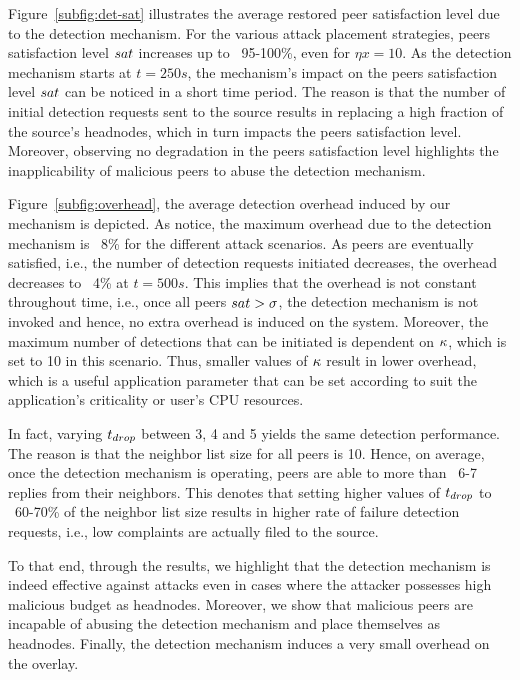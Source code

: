 Figure~\ref{subfig:det-sat} illustrates the average restored peer satisfaction level due to the detection mechanism.
For the various attack placement strategies, peers satisfaction level $sat$ increases up to ~95-100\%, even for $\eta x=10$.
As the detection mechanism starts at $t=250s$, the mechanism's impact on the peers satisfaction level $sat$ can be noticed in a short time period.
The reason is that the number of initial detection requests sent to the source results in replacing a high fraction of the source's headnodes, which in turn impacts the peers satisfaction level.
Moreover, observing no degradation in the peers satisfaction level highlights the inapplicability of malicious peers to abuse the detection mechanism.

Figure~\ref{subfig:overhead}, the average detection overhead induced by our mechanism is depicted.
As notice, the maximum overhead due to the detection mechanism is ~8\% for the different attack scenarios.
As peers are eventually satisfied, i.e., the number of detection requests initiated decreases, the overhead decreases to ~4\% at $t=500s$.
This implies that the overhead is not constant throughout time, i.e., once all peers $sat > \sigma$, the detection mechanism is not invoked and hence, no extra overhead is induced on the system.
Moreover, the maximum number of detections that can be initiated is dependent on $\kappa$, which is set to 10 in this scenario.
Thus, smaller values of $\kappa$ result in lower overhead, which is a useful application parameter that can be set according to suit the application's criticality or user's CPU resources.

In fact, varying $t_{drop}$ between 3, 4 and 5 yields the same detection performance.
The reason is that the neighbor list size for all peers is 10. 
Hence, on average, once the detection mechanism is operating, peers are able to more than ~6-7 replies from their neighbors.
This denotes that setting higher values of $t_{drop}$ to ~60-70\% of the neighbor list size results in higher rate of failure detection requests, i.e., low complaints are actually filed to the source. 

To that end, through the results, we highlight that the detection mechanism is indeed effective against \drop attacks even in cases where the attacker possesses high malicious budget as headnodes.
Moreover, we show that malicious peers are incapable of abusing the detection mechanism and place themselves as headnodes. Finally, the detection mechanism induces a very small overhead on the overlay.


